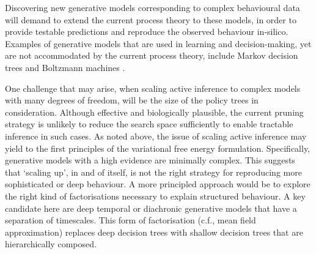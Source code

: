 \documentclass[review,12pt,authoryear]{elsarticle}
\begin{document}
Discovering new generative models corresponding to complex behavioural data will demand to extend the current process theory to these models, in order to provide testable predictions and reproduce the observed behaviour in-silico. Examples of generative models that are used in learning and decision-making, yet are not accommodated by the current process theory, include Markov decision trees \citep{jordanIntroductionVariationalMethods1998,jordanHiddenMarkovDecision1997} and Boltzmann machines \citep{stoneArtificialIntelligenceEngines2019,ackleyLearningAlgorithmBoltzmann1985,salakhutdinovEfficientLearningProcedure2012}. %

One challenge that may arise, when scaling active inference to complex models with many degrees of freedom, will be the size of the policy trees in consideration. Although effective and biologically plausible, the current pruning strategy is unlikely to reduce the search space sufficiently to enable tractable inference in such cases. As noted above, the issue of scaling active inference may yield to the first principles of the variational free energy formulation. Specifically, generative models with a high evidence are minimally complex. This suggests that ‘scaling up’, in and of itself, is not the right strategy for reproducing more sophisticated or deep behaviour. A more principled approach would be to explore the right kind of factorisations necessary to explain structured behaviour. A key candidate here are deep temporal or diachronic generative models that have a separation of timescales. This form of factorisation (c.f., mean field approximation) replaces deep decision trees with shallow decision trees that are hierarchically composed.
\end{document}
